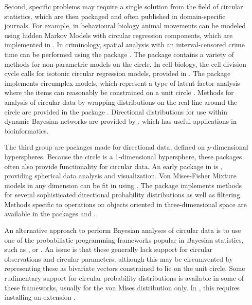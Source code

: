 Second, specific problems may require a single solution from the field
of circular statistics, which are then packaged and often published in
domain-specific journals. For example, in behavioural biology animal
movements can be modeled using hidden Markov Models with circular
regression components, which are implemented in 
\citep{mcclintock2018momentuhmm}. In criminology, spatial analysis with
an interval-censored crime time can be performed using the package
 \citep{kikuchi2015package}. The package 
\citep{JSSv061i09} contains a variety of methods for non-parametric
models on the circle. In cell biology, the cell division cycle calls for
isotonic circular regression models, provided in 
\citep{barragan2013isocir}. The  package 
\citep{grassi2010circe} implements circumplex models, which represent a
type of latent factor analysis where the items can reasonably be
constrained on a unit circle \citep{browne1992circumplex}. Methods for
analysis of circular data by wrapping distributions on the real line
around the circle are provided in the  package 
\citep{nadarajah2017wrapped}. Directional distributions for use within
dynamic Bayesian networks are provided by 
\citep{paluszewski2010mocapy}, which has useful applications in
bioinformatics.

The third group are packages made for directional data, defined on
\(p\)-dimensional hyperspheres. Because the circle is a 1-dimensional
hypersphere, these packages often also provide functionality for
circular data. An early package in  is 
\citep{leong1998methods}, providing spherical data analysis and
visualization. Von Mises-Fisher Mixture models in any dimension can be
fit in  using  \citep{hornik2014movmf}. The
 package 
\citep{kurz2017directional} implements methods for several sophisticated
directional probability distributions as well as filtering. Methods
specific to operations on objects oriented in three-dimensional space
are available in the  packages 
\citep{murdoch2003orientlib} and 
\citep{stanfill2014rotations}.

An alternative approach to perform Bayesian analyses of circular data is
to use one of the probabilistic programming frameworks popular in
Bayesian statistics, such as ,  or
. An issue is that these generally lack support for
circular observations and circular parameters, although this may be
circumvented by representing these as bivariate vectors constrained to
lie on the unit circle. Some rudimentary support for circular
probability distributions is available in some of these frameworks,
usually for the von Mises distribution only. In , this
requires installing an extension \citep{jagsvonmises}.

